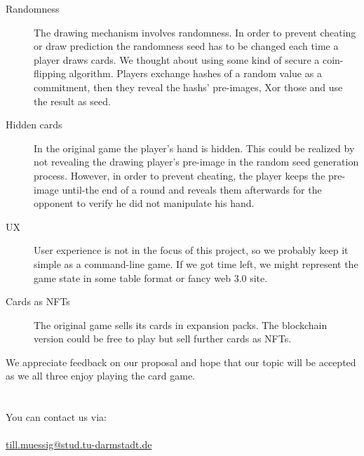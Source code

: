\documentclass[
	paper=a0,
	ngerman,
	accentcolor=1d,
	logo=body,%
	footer=true,
	]{tudaposter}
\begin{document}
\begin{multicols}{2}
\begin{description}
\item[Randomness]
The drawing mechanism involves randomness. In order to prevent cheating or draw prediction the randomness seed has to be changed each time a player draws cards. We thought about using some kind of secure a coin-flipping algorithm. Players exchange hashes of a random value as a commitment, then they reveal the hashs' pre-images, Xor those and use the result as seed.

\item[Hidden cards]
In the original game the player's hand is hidden. This could be realized by not revealing the drawing player's pre-image in the random seed generation process. However, in order to prevent cheating, the player keeps the pre-image until-the end of a round and reveals them afterwards for the opponent to verify he did not manipulate his hand.

\item[UX]
User experience is not in the focus of this project, so we probably keep it simple as a command-line game. If we got time left, we might represent the game state in some table format or fancy web 3.0 site.\\

\item[Cards as NFTs]
The original game sells its cards in expansion packs. The blockchain version could be free to play but sell further cards as NFTs.

\end{description}



\end{multicols}
\vspace{60 pt}
We appreciate feedback on our proposal and hope that our topic will be accepted as we all three enjoy playing the card game.\\
\\\\
You can contact us via:\\
\\
\href{mailto:till.muessig@stud.tu-darmstadt.de}{till.muessig@stud.tu-darmstadt.de}
\end{document}
